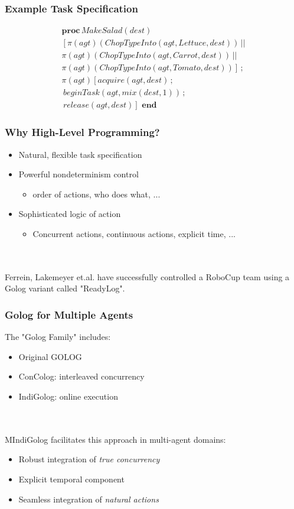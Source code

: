 \documentclass[compress]{beamer}
\begin{document}
\begin{frame}
\frametitle{Example Task Specification}
\begin{multline*}
\mathbf{proc}\, MakeSalad(dest)\\
\left[\pi(agt)(ChopTypeInto(agt,Lettuce,dest))\,||\right.\\
\pi(agt)(ChopTypeInto(agt,Carrot,dest))\,||\\
\left.\pi(agt)(ChopTypeInto(agt,Tomato,dest))\right]\,;\\
\pi(agt)\left[acquire(agt,dest)\,;\right.\\
\,beginTask(agt,mix(dest,1))\,;\\
\left.\, release(agt,dest)\right]\,\,\mathbf{end}
\end{multline*}
\end{frame}

\begin{frame}
\frametitle{Why High-Level Programming?}
\begin{itemize}
\item Natural, flexible task specification
\item Powerful nondeterminism control
  \begin{itemize}
  \item order of actions, who does what, ...
  \end{itemize}
\item Sophisticated logic of action
  \begin{itemize}
  \item Concurrent actions, continuous actions, explicit time, ...
  \end{itemize}
\end{itemize}
\ \\
\ \\
Ferrein, Lakemeyer et.al. have successfully controlled a RoboCup team using
a Golog variant called "ReadyLog".
\end{frame}

\begin{frame}
\frametitle{Golog for Multiple Agents}
The "Golog Family" includes:
\begin{itemize}
  \item Original GOLOG
  \item ConColog: interleaved concurrency
  \item IndiGolog: online execution
\end{itemize}
\ \\
\ \\
MIndiGolog facilitates this approach in multi-agent domains:
\begin{itemize}
\item Robust integration of \emph{true concurrency}
\item Explicit temporal component
\item Seamless integration of \emph{natural actions}
\end{itemize}
\end{frame}
\end{document}
